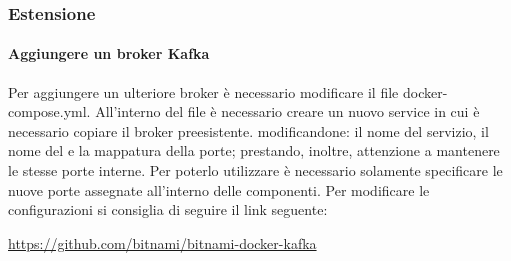 	\subsubsection{Estensione}
		\paragraph{Aggiungere un broker Kafka}
		Per aggiungere un ulteriore broker è necessario modificare il file docker-compose.yml.
		\newline
		All'interno del file è necessario creare un nuovo service in cui è necessario copiare il broker preesistente. modificandone: il nome del servizio, il nome del  e la mappatura della porte; prestando, inoltre, attenzione a mantenere le stesse porte interne.
		\newline
		Per poterlo utilizzare è necessario solamente specificare le nuove porte assegnate all'interno delle componenti.
		\newline
		Per modificare le configurazioni si consiglia di seguire il link seguente:
		\begin{center}
			\url{https://github.com/bitnami/bitnami-docker-kafka}
		\end{center}
			   
	